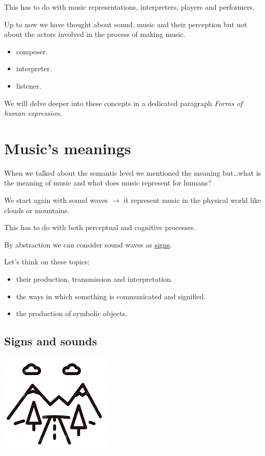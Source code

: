 This has to do with music representations, interpreters, players and performers.

Up to now we have thought about sound, music and their perception but not about the actors involved in the process of making music.

\begin{itemize}
\tightlist
\item composer.
\item interpreter.
\item listener.
\end{itemize}

We will delve deeper into these concepts in a dedicated paragraph \textit{Forms of human expression}.

\section{Music's meanings }\label{musics-meanings}

When we talked about the semantic level we mentioned the meaning but\ldots what is the meaning of music and what does music represent for humans?

We start again with sound waves \(\rightarrow\) it represent music in the physical world like clouds or mountains.

This has to do with both perceptual and cognitive processes.

By abstraction we can consider sound waves as \href{http://www.musicaecodice.it/gitmedia/emc/1_media/segno1.mp4}{signs}.

Let's think on these topics: 

\begin{itemize}
\tightlist
\item their production, transmission and interpretation. 
\item the ways in which something is communicated and signified. 
\item the production of symbolic objects.
\end{itemize}

\subsection{Signs and sounds }\label{signs-and-sounds}

\begin{center}
\includegraphics[scale=0.45]{../img/montagne.png}
\end{center}

